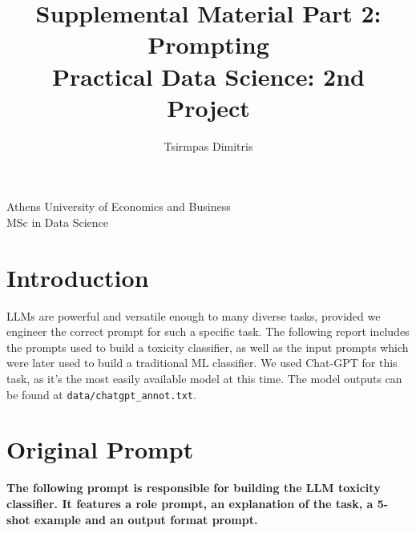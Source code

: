 \documentclass[11pt, a4paper]{article}
\title{\Huge Supplemental Material Part 2: Prompting \\
	\LARGE Practical Data Science: 2nd Project}
\author{\Large  Tsirmpas Dimitris }
\def\code#1{\texttt{#1}}
\begin{document}
	
	
	\maketitle
	\begin{center}
		\large Athens University of Economics and Business \\
		\large MSc in Data Science
		
	\end{center}
	
	
	\section{Introduction}
	LLMs are powerful and versatile enough to many diverse tasks, provided we engineer the correct prompt for such a specific task.
	The following report includes the prompts used to build a toxicity classifier, as well as the input prompts which were later used to build a traditional ML classifier. We used Chat-GPT for this task, as it's the most easily available model at this time. The model outputs can be found at \code{data/chatgpt\_annot.txt}.
	
	
	\section{Original Prompt}
	\textbf{The following prompt is responsible for building the LLM toxicity classifier. It features a role prompt, an explanation of the task, a 5-shot example and an output format prompt.} 
	
\end{document}
